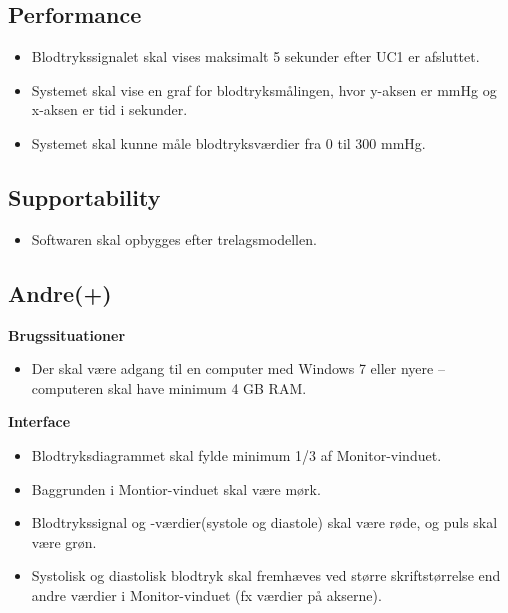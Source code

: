 \subsection{Performance}
\begin{itemize}
	\item Blodtrykssignalet skal vises maksimalt 5 sekunder efter UC1 er afsluttet.
	\item Systemet skal vise en graf for blodtryksmålingen, hvor y-aksen er mmHg og x-aksen er tid i sekunder.
	\item Systemet skal kunne måle blodtryksværdier fra 0 til 300 mmHg.
\end{itemize}

\subsection{Supportability}
\begin{itemize}
	\item Softwaren skal opbygges efter trelagsmodellen.
\end{itemize}

\subsection{Andre(+)}
\textbf{Brugssituationer}
\begin{itemize}
	\item Der skal være adgang til en computer med Windows 7 eller nyere – computeren skal have minimum 4 GB RAM.
\end{itemize}
\textbf{Interface}
\begin{itemize}
	\item Blodtryksdiagrammet skal fylde minimum 1/3 af Monitor-vinduet.
	\item Baggrunden i Montior-vinduet skal være mørk.
	\item Blodtrykssignal og -værdier(systole og diastole) skal være røde, og puls skal være grøn.
	\item Systolisk og diastolisk blodtryk skal fremhæves ved større skriftstørrelse end andre værdier i Monitor-vinduet (fx værdier på akserne).
\end{itemize}













